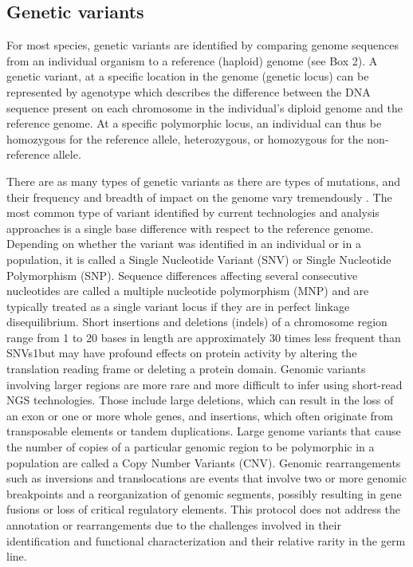\subsection{Genetic variants}

For most species, genetic variants are identified by comparing genome sequences from an individual organism to a reference (haploid) genome (see Box 2). A genetic variant, at a specific location in the genome (genetic locus) can be represented by agenotype which describes the difference between the DNA sequence present on each chromosome in the individual’s diploid genome and the reference genome. At a specific polymorphic locus, an individual can thus be homozygous for the reference allele, heterozygous, or homozygous for the non-reference allele.

There are as many types of genetic variants as there are types of mutations, and their frequency and breadth of impact on the genome vary tremendously \cite{ng2009targeted}. The most common type of variant identified by current technologies and analysis approaches is a single base difference with respect to the reference genome. Depending on whether the variant was identified in an individual or in a population, it is called a Single Nucleotide Variant (SNV) or Single Nucleotide Polymorphism (SNP). Sequence differences affecting several consecutive nucleotides are called a multiple nucleotide polymorphism (MNP) and are typically treated as a single variant locus if they are in perfect linkage disequilibrium. Short insertions and deletions (indels) of a chromosome region range from 1 to 20 bases in length are approximately 30 times less frequent than SNVs1but may have profound effects on protein activity by altering the translation reading frame or deleting a protein domain. Genomic variants involving larger regions are more rare and more difficult to infer using short-read NGS technologies. Those include large deletions, which can result in the loss of an exon or one or more whole genes, and insertions, which often originate from transposable elements or tandem duplications. Large genome variants that cause the number of copies of a particular genomic region to be polymorphic in a population are called a Copy Number Variants (CNV). Genomic rearrangements such as inversions and translocations are events that involve two or more genomic breakpoints and a reorganization of genomic segments, possibly resulting in gene fusions or loss of critical regulatory elements. This protocol does not address the annotation or rearrangements due to the challenges involved in their identification and functional characterization and their relative rarity in the germ line.

